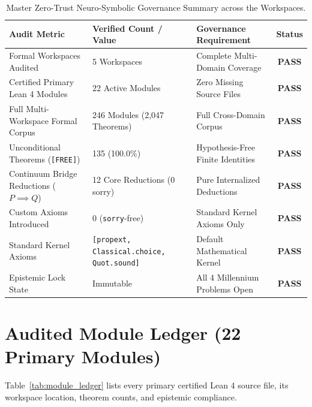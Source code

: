 \documentclass[11pt,a4paper]{article}
\begin{document}
\begin{table}[h!]
\centering
\small
\begin{tabular}{lllc}
\toprule
\textbf{Audit Metric} & \textbf{Verified Count / Value} & \textbf{Governance Requirement} & \textbf{Status} \\
\midrule
Formal Workspaces Audited & 5 Workspaces & Complete Multi-Domain Coverage & \textbf{PASS} \\
Certified Primary Lean 4 Modules & 22 Active Modules & Zero Missing Source Files & \textbf{PASS} \\
Full Multi-Workspace Formal Corpus & 246 Modules (2,047 Theorems) & Full Cross-Domain Corpus & \textbf{PASS} \\
Unconditional Theorems (\texttt{[FREE]}) & 135 (100.0\%) & Hypothesis-Free Finite Identities & \textbf{PASS} \\
Continuum Bridge Reductions ($P \implies Q$) & 12 Core Reductions (0 sorry) & Pure Internalized Deductions & \textbf{PASS} \\
Custom Axioms Introduced & 0 (\texttt{sorry}-free) & Standard Kernel Axioms Only & \textbf{PASS} \\
Standard Kernel Axioms & \texttt{[propext, Classical.choice, Quot.sound]} & Default Mathematical Kernel & \textbf{PASS} \\
Epistemic Lock State & Immutable & All 4 Millennium Problems Open & \textbf{PASS} \\
\bottomrule
\end{tabular}
\caption{Master Zero-Trust Neuro-Symbolic Governance Summary across the Workspaces.}
\label{tab:governance_summary}
\end{table}

\section{Audited Module Ledger (22 Primary Modules)}

Table~\ref{tab:module_ledger} lists every primary certified Lean 4 source file, its workspace location, theorem counts, and epistemic compliance.
\end{document}
